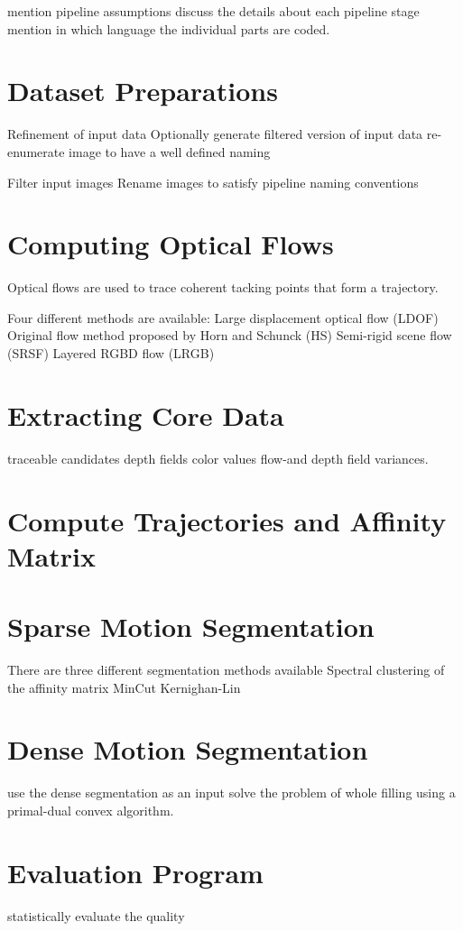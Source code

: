 mention pipeline assumptions
discuss the details about each pipeline stage
mention in which language the individual parts are coded.

\section{Dataset Preparations}
Refinement of input data
Optionally generate filtered version of input data
re-enumerate image to have a well defined naming

Filter input images
Rename images to satisfy pipeline naming conventions

\section{Computing Optical Flows}

Optical flows are used to trace coherent tacking points that form a trajectory.

Four different methods are available:
Large displacement optical flow (LDOF)
Original flow method proposed by Horn and Schunck (HS)
Semi-rigid scene flow (SRSF)
Layered RGBD flow (LRGB)


\section{Extracting Core Data}


traceable candidates
depth fields
color values
flow-and depth field variances.

\section{Compute Trajectories and Affinity Matrix}
\section{Sparse Motion Segmentation}
There are three different segmentation methods available
Spectral clustering of the affinity matrix
MinCut
Kernighan-Lin 
\section{Dense Motion Segmentation}
use the dense segmentation as an input solve the problem of whole filling using a primal-dual convex algorithm. 
\section{Evaluation Program}
statistically evaluate the quality
